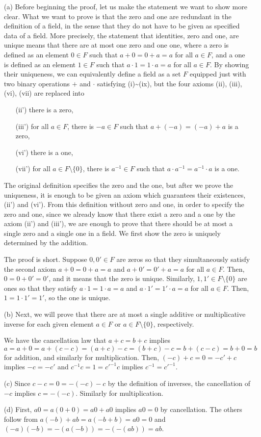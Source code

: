 \documentclass{../../large}
\begin{document}
\begin{pf}
(a)
Before beginning the proof, let us make the statement we want to show more clear.
What we want to prove is that the zero and one are redundant in the definition of a field, in the sense that they do not have to be given as specified data of a field.
More precisely, the statement that identities, zero and one, are unique means that there are at most one zero and one one, where a zero is defined as an element $0\in F$ such that $a+0=0+a=a$ for all $a\in F$, and a one is defined as an element $1\in F$ such that $a\cdot 1=1\cdot a=a$ for all $a\in F$.
By showing their uniqueness, we can equivalently define a field as a set $F$ equipped just with two binary operations $+$ and $\cdot$ satisfying (i)\sim(ix), but the four axioms (ii), (iii), (vi), (vii) are replaced into
\begin{enumerate}
\item[(ii')] there is a zero,
\item[(iii')] for all $a\in F$, there is $-a\in F$ such that $a+(-a)=(-a)+a$ is a zero,
\item[(vi')] there is a one,
\item[(vii')] for all $a\in F\setminus\{0\}$, there is $a^{-1}\in F$ such that $a\cdot a^{-1}=a^{-1}\cdot a$ is a one.
\end{enumerate}
The original definition specifies the zero and the one, but after we prove the uniqueness, it is enough to be given an axiom which guarantees their existences, (ii') and (vi').
From this definition without zero and one, in order to specify the zero and one, since we already know that there exist a zero and a one by the axiom (ii') and (iii'), we are enough to prove that there should be at most a single zero and a single one in a field.
We first show the zero is uniquely determined by the addition.

The proof is short.
Suppose $0,0'\in F$ are zeros so that they simultaneously satisfy the second axiom $a+0=0+a=a$ and $a+0'=0'+a=a$ for all $a\in F$.
Then, $0=0+0'=0'$, and it means that the zero is unique.
Similarly, $1,1'\in F\setminus\{0\}$ are ones so that they satisfy $a\cdot 1=1\cdot a=a$ and $a\cdot 1'=1'\cdot a=a$ for all $a\in F$.
Then, $1=1\cdot 1'=1'$, so the one is unique.



(b)
Next, we will prove that there are at most a single additive or multiplicative inverse for each given element $a\in F$ or $a\in F\setminus\{0\}$, respectively.


We have the cancellation law that $a+c=b+c$ implies $a=a+0=a+(c-c)=(a+c)-c=(b+c)-c=b+(c-c)=b+0=b$ for addition, and similarly for multiplication.
Then, $(-c)+c=0=-c'+c$ implies $-c=-c'$ and $c^{-1}c=1=c'^{-1}c$ implies $c^{-1}=c'^{-1}$.


(c)
Since $c-c=0=-(-c)-c$ by the definition of inverses, the cancellation of $-c$ implies $c=-(-c)$.
Similarly for multiplication.

(d)
First, $a0=a(0+0)=a0+a0$ implies $a0=0$ by cancellation.
The others follow from $a(-b)+ab=a(-b+b)=a0=0$ and $(-a)(-b)=-(a(-b))=-(-(ab))=ab$.
\end{pf}
\end{document}
